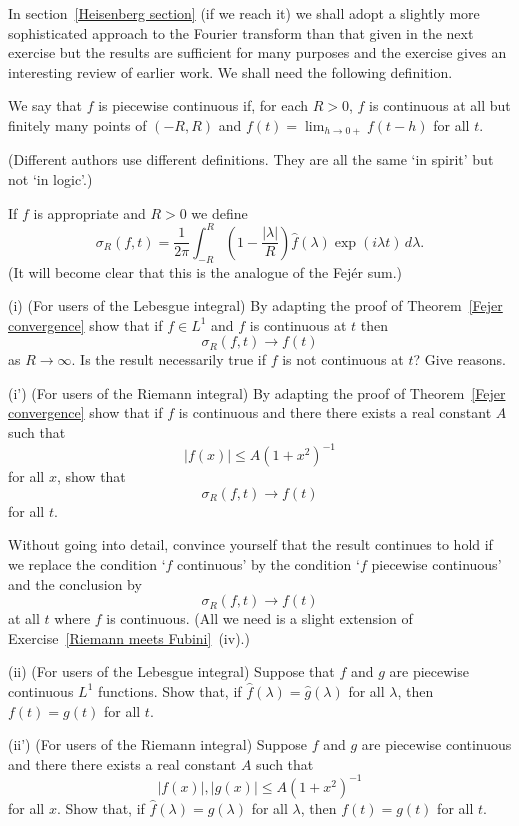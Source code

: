 In section~\ref{Heisenberg section} (if we reach it)
we shall adopt a slightly more sophisticated approach
to the Fourier transform than that given in the next
exercise but the results are sufficient for many purposes
and the exercise gives an interesting review of
earlier work. We shall need the following definition.
\begin{definition} We say that $f$ is piecewise
continuous if, for each $R>0$, $f$ is continuous
at all but finitely many points of $(-R,R)$ and
$f(t)=\lim_{h\rightarrow 0+}f(t-h)$ for all $t$.
\end{definition}
(Different authors use different definitions. They
are all the same `in spirit' but not `in logic'.)
\begin{exercise}\label{Crude uniqueness}
If $f$ is appropriate and $R>0$ we define
\[\sigma_{R}(f,t)=\frac{1}{2\pi}\int_{-R}^{R}
\left(1-\frac{|\lambda|}{R}\right)\hat{f}(\lambda)
\exp(i\lambda t)\,d\lambda.\]
(It will become clear that this is the analogue of
the Fej\'{e}r sum.)

(i) (For users of the Lebesgue integral)
By adapting the proof
of Theorem~\ref{Fejer convergence} show that
if $f\in L^{1}$ and $f$ is continuous at $t$
then
\[\sigma_{R}(f,t)\rightarrow f(t)\]
as $R\rightarrow\infty$. Is the result necessarily true
if $f$ is not continuous at $t$? Give reasons.

(i') (For users of the Riemann integral) By adapting the proof
of Theorem~\ref{Fejer convergence} show that
if $f$ is continuous and there
there exists a real constant $A$ such that
\[|f(x)|\leq A(1+x^{2})^{-1}\]
for all $x$, show that
\[\sigma_{R}(f,t)\rightarrow f(t)\]
for all $t$.

Without going into detail, convince yourself that
the result continues to hold if we replace
the condition `$f$ continuous' by the condition
`$f$ piecewise continuous'  and the conclusion by
\[\sigma_{R}(f,t)\rightarrow f(t)\]
at all $t$ where $f$ is continuous.
(All we need is a slight extension of
Exercise~\ref{Riemann meets Fubini}~(iv).)

(ii) (For users of the Lebesgue integral)
Suppose that $f$ and $g$
are piecewise continuous $L^{1}$
functions. Show that, if $\hat{f}(\lambda)=\hat{g}(\lambda)$
for all $\lambda$, then $f(t)=g(t)$ for all $t$.

(ii') (For users of the Riemann integral)
Suppose $f$ and $g$ are piecewise continuous
and there
there exists a real constant $A$ such that
\[|f(x)|,|g(x)|\leq A(1+x^{2})^{-1}\]
for all $x$. Show that, if $\hat{f}(\lambda)=\hat{g}(\lambda)$
for all $\lambda$, then $f(t)=g(t)$ for all $t$.
\end{exercise}



